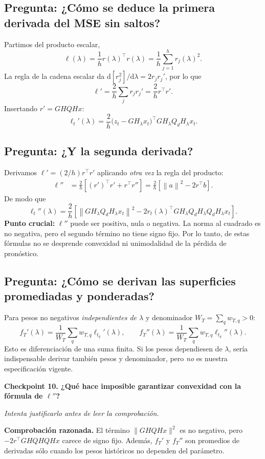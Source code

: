 \documentclass[11pt,letterpaper,parskip=half,headings=small]{scrartcl}
\theoremstyle{definition}\newtheorem{definicion}[proposicion]{Definición}
\theoremstyle{remark}\newtheorem{observacion}[proposicion]{Observación}
\newcommand{\norm}[1]{\left\lVert#1\right\rVert}\newcommand{\inner}[2]{\left\langle#1,#2\right\rangle}
\newcommand{\dt}{\mathrm d}\newcommand{\Q}{Q_d}
\newcommand{\pregunta}[1]{\subsection{Pregunta: #1}}
\newcommand{\checkpoint}[3]{%
  \par\medskip\noindent\textbf{\color{blue!45!black}Checkpoint #1. #2}\par
  \noindent\emph{Intenta justificarlo antes de leer la comprobación.}\par
  \noindent\textbf{Comprobación razonada. }#3\par\bigskip
}
\begin{document}
\pregunta{¿Cómo se deduce la primera derivada del MSE sin saltos?}
Partimos del producto escalar,
\[
\ell(\lambda)=\frac1h r(\lambda)^\top r(\lambda)=\frac1h\sum_{j=1}^hr_j(\lambda)^2.
\]
La regla de la cadena escalar da $\dt[r_j^2]/\dt\lambda=2r_jr_j'$, por lo que
\[
\ell'=\frac2h\sum_jr_jr_j'=\frac2h r^\top r'.
\]
Insertando $r'=GHQHx$:
\begin{equation}\label{eq:lossprime}
\boxed{\ell_t'(\lambda)=\frac2h
\bigl(z_t-GH_\lambda x_t\bigr)^\top
GH_\lambda Q_dH_\lambda x_t.}
\end{equation}

\pregunta{¿Y la segunda derivada?}
Derivamos $\ell'=(2/h)r^\top r'$ aplicando \emph{otra vez} la regla del producto:
\begin{align*}
\ell''&=\frac2h\left[(r')^\top r'+r^\top r''\right]
=\frac2h\left[\norm a^2-2r^\top b\right].
\end{align*}
De modo que
\begin{equation}\label{eq:losssecond}
\boxed{\ell_t''(\lambda)=\frac2h\left[
\norm{GH_\lambda Q_dH_\lambda x_t}^2
-2r_t(\lambda)^\top GH_\lambda Q_dH_\lambda Q_dH_\lambda x_t\right].}
\end{equation}
\textbf{Punto crucial:} $\ell''$ puede ser positiva, nula o negativa. La norma al cuadrado es no negativa, pero el segundo término no tiene signo fijo. Por lo tanto, de estas fórmulas no se desprende convexidad ni unimodalidad de la pérdida de pronóstico.

\pregunta{¿Cómo se derivan las superficies promediadas y ponderadas?}
Para pesos no negativos \emph{independientes de $\lambda$} y denominador $W_T=\sum_qw_{T,q}>0$:
\begin{equation}\label{eq:weighted-deriv}
f_T'(\lambda)=\frac1{W_T}\sum_qw_{T,q}\ell_{t_q}'(\lambda),\qquad
f_T''(\lambda)=\frac1{W_T}\sum_qw_{T,q}\ell_{t_q}''(\lambda).
\end{equation}
Esto es diferenciación de una suma finita. Si los pesos dependiesen de $\lambda$, sería indispensable derivar también pesos y denominador, pero \emph{no} es nuestra especificación vigente.

\checkpoint{10}{¿Qué hace imposible garantizar convexidad con la fórmula de $\ell''$?}{El término $\|GHQHx\|^2$ es no negativo, pero $-2r^\top GHQHQHx$ carece de signo fijo. Además, $f_T'$ y $f_T''$ son promedios de derivadas sólo cuando los pesos históricos no dependen del parámetro.}
\end{document}
